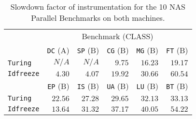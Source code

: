 
\begin{table}
    \centering
    \begin{tabular}{lrrrrr}
        \toprule
         & \multicolumn{5}{c}{Benchmark (CLASS)} \\
        \cmidrule(lr){2-6}
            &\texttt{DC} (A) &\texttt{SP} (B)&\texttt{CG} (B)&\texttt{MG} (B)&\texttt{FT} (B) \\ 
        \cmidrule(lr){2-6}
        \texttt{Turing} &$N/A$ &$N/A$ &$9.75 $ &$16.23$ &$19.17$ \\
        \texttt{Idfreeze} &$4.30$  & $4.07$  &  $19.92$ &   $30.66$ &    $60.54$ \\
        \midrule
        \midrule
                &\texttt{EP} (B)&\texttt{IS} (B)&\texttt{UA} (B)&\texttt{LU} (B)&\texttt{BT} (B)\\
        \cmidrule(lr){2-6}
        \texttt{Turing} &$22.56$ &$27.28$ &$29.65$ &$32.13$ &$33.13$ \\
        \texttt{Idfreeze} & $13.64$ &$31.32$ & $37.17$ &  $40.05$ &   $54.22$ \\
        \bottomrule
    \end{tabular}
    \caption{Slowdown factor of \TABARNAC instrumentation for the 10 NAS Parallel
        Benchmarks on both machines.}
    \label{tab:ovh}
\end{table}

